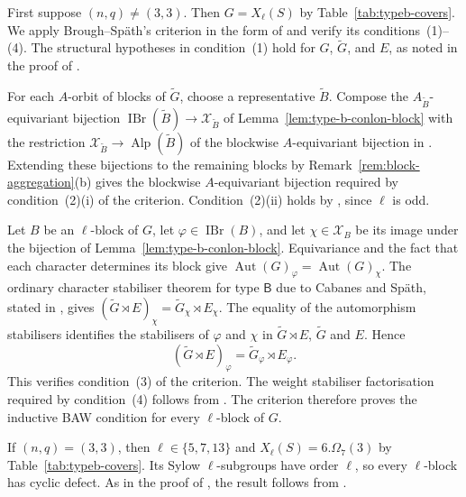 \documentclass[10pt]{amsart}
\theoremstyle{definition}
\let\oldendproof\endproof
\renewenvironment{proof}[1][\proofname]{%
  \oldproof[\bfseries #1]%
}{\oldendproof}
\DeclareMathOperator{\Aut}{Aut}
\DeclareMathOperator{\IBr}{IBr}
\DeclareMathOperator{\Alp}{Alp}
\numberwithin{equation}{section}
\numberwithin{table}{section}
\begin{document}
\begin{proof}
First suppose $(n,q)\neq(3,3)$.  Then $G=X_\ell(S)$ by
Table~\ref{tab:typeb-covers}.  We apply Brough--Sp\"ath's criterion in
the form of \cite[Theorem~2.1]{FengLiZhang2022TypeB} and verify its
conditions~\textup{(1)--(4)}.
The structural hypotheses in condition~\textup{(1)} hold for $G$,
$\widetilde G$, and $E$, as noted in the proof of
\cite[Theorem~1]{FengLiZhang2022TypeB}.

For each $A$-orbit of blocks of $\widetilde G$, choose a
representative $\widetilde B$. Compose the
$A_{\widetilde B}$-equivariant bijection
$\IBr(\widetilde B)\longrightarrow\mathcal X_{\widetilde B}$
of Lemma~\ref{lem:type-b-conlon-block} with the restriction
$\mathcal X_{\widetilde B}\longrightarrow\Alp(\widetilde B)$
of the blockwise $A$-equivariant bijection in
\cite[Proposition~7.2]{FengLiZhang2022TypeB}.
Extending these bijections to the remaining blocks by
Remark~\ref{rem:block-aggregation}\textup{(b)} gives the blockwise $A$-equivariant
bijection required by condition~\textup{(2)(i)} of the
criterion. Condition~\textup{(2)(ii)} holds by
\cite[Remark~2.2]{FengLiZhang2022TypeB}, since $\ell$ is odd.

Let $B$ be an $\ell$-block of $G$, let $\varphi\in\IBr(B)$, and let
$\chi\in\mathcal X_B$ be its image under the bijection of
Lemma~\ref{lem:type-b-conlon-block}. Equivariance and the fact that each
character determines its block give $\Aut(G)_\varphi=\Aut(G)_\chi$.
The ordinary character stabiliser theorem for type $\mathsf B$ due to
Cabanes and Sp\"ath, stated in
\cite[Theorem~3.10]{FengLiZhang2022TypeB}, gives
$(\widetilde G\rtimes E)_\chi=\widetilde G_\chi\rtimes E_\chi$.
The equality of the automorphism stabilisers identifies the stabilisers of
$\varphi$ and $\chi$ in $\widetilde G\rtimes E$, $\widetilde G$ and $E$.
Hence
\[
 (\widetilde G\rtimes E)_\varphi
   =\widetilde G_\varphi\rtimes E_\varphi.
\]
This verifies condition~\textup{(3)} of the criterion.
The weight stabiliser factorisation required by condition~\textup{(4)}
follows from \cite[Proposition~7.5]{FengLiZhang2022TypeB}.
The criterion therefore proves the inductive BAW condition for every
$\ell$-block of $G$.

If $(n,q)=(3,3)$, then $\ell\in\{5,7,13\}$ and
$X_\ell(S)=6.\Omega_7(3)$ by Table~\ref{tab:typeb-covers}.
Its Sylow $\ell$-subgroups have order $\ell$, so every $\ell$-block has
cyclic defect. As in the proof of \cite[Theorem~1]{FengLiZhang2022TypeB},
the result follows from \cite[Theorem~1.1]{KoshitaniSpath2016}.
\end{proof}
\end{document}
